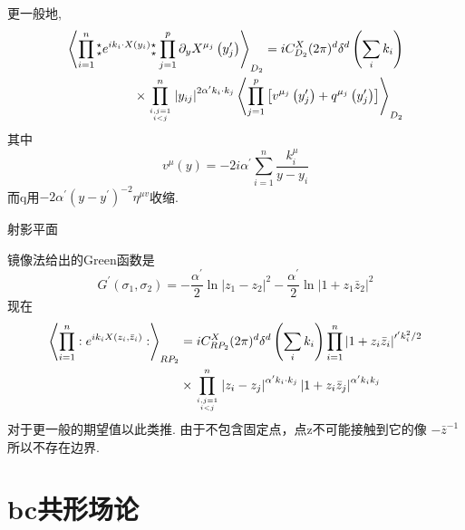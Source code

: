 更一般地,
\begin{equation}
\begin{aligned}
\left\langle\prod_{i=1}^{n} {}_\star^\star e^{i k_{i} \cdot X\left(y_{i}\right) }{}_\star^\star \prod_{j=1}^{p} \partial_{y} X^{\mu_{j}}\left(y_{j}^{\prime}\right)\right\rangle_{D_{2}}=i C_{D_{2}}^{X}(2 \pi)^{d} \delta^{d}\left(\sum_{i} k_{i}\right) \\
\times \prod_{i, j=1 \atop i<j}^{n}\left|y_{i j}\right|^{2 \alpha^{\prime} k_{i} \cdot k_{j}}\left\langle\prod_{j=1}^{p}\left[v^{\mu_{j}}\left(y_{j}^{\prime}\right)+q^{\mu_{j}}\left(y_{j}^{\prime}\right)\right]\right\rangle_{D_{2}}
\end{aligned}
\end{equation}
其中
\begin{equation}
	v^{\mu}(y)=-2 i \alpha^{\prime} \sum_{i=1}^{n} \frac{k_{i}^{\mu}}{y-y_{i}}
\end{equation}
而q用$-2 \alpha^{\prime}\left(y-y^{\prime}\right)^{-2} \eta^{\mu v}$收缩.\\

\centerline{\Large 射影平面}
镜像法给出的Green函数是
\begin{equation}
	G^{\prime}\left(\sigma_{1}, \sigma_{2}\right)=-\frac{\alpha^{\prime}}{2} \ln \left|z_{1}-z_{2}\right|^{2}-\frac{\alpha^{\prime}}{2} \ln \left|1+z_{1} \bar{z}_{2}\right|^{2}
\end{equation}
现在
\begin{equation}
	\begin{aligned}
		\left\langle\prod_{i=1}^{n}: e^{i k_{i} X\left(z_{i}, \bar{z}_{i}\right)}:\right\rangle_{R P_{2}} &=i C_{R P_{2}}^{X}(2 \pi)^{d} \delta^{d}\left(\sum_{i} k_{i}\right) \prod_{i=1}^{n}\left|1+z_{i} \bar{z}_{i}\right|^{\prime^{\prime} k_{i}^{2} / 2} \\
		& \times \prod_{i, j=1 \atop i<j}^{n}\left|z_{i}-z_{j}\right|^{\alpha^{\prime} k_{i} \cdot k_{j}}\left|1+z_{i} \bar{z}_{j}\right|^{\alpha^{\prime} k_{i} k_{j}}
	\end{aligned}
\end{equation}
对于更一般的期望值以此类推. 由于不包含固定点，点z不可能接触到它的像 $-\bar{z}^{-1}$所以不存在边界.

\section{bc共形场论}%

